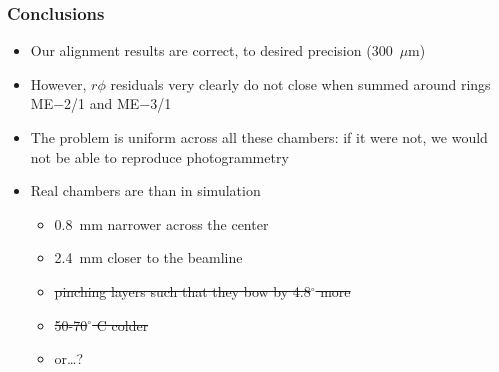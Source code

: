 \documentclass[compress]{beamer}
\begin{document}

\begin{frame}
\frametitle{Conclusions}
\begin{itemize}\setlength{\itemsep}{0.5 cm}

\item Our alignment results are correct, to desired precision (300~$\mu$m)

\item However, $r\phi$ residuals very clearly do not close when summed around rings ME$-$2/1 and ME$-$3/1

\item The problem is uniform across all these chambers: if it were
  not, we would not be able to reproduce photogrammetry

\item Real chambers are \underline{\mbox{\hspace{1 cm}}} than in simulation
\begin{itemize}\setlength{\itemsep}{0.1 cm}
\item 0.8~mm narrower across the center
\item 2.4~mm closer to the beamline
\item \sout{pinching layers such that they bow by 4.8$^\circ$ more}
\item \sout{50-70$^\circ$ C colder}
\item or\ldots?
\end{itemize}

\end{itemize}
\label{numpages}
\end{frame}
\end{document}
